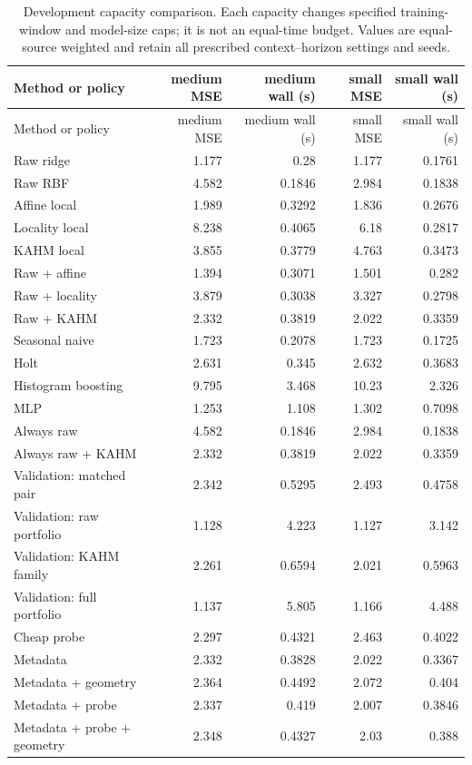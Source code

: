 {\small\setlength{\tabcolsep}{4pt}
\begin{longtable}{lrrrr}
\caption{Development capacity comparison. Each capacity changes specified training-window and model-size caps; it is not an equal-time budget. Values are equal-source weighted and retain all prescribed context--horizon settings and seeds.}\label{tab:capacity-development}\\
\toprule
Method or policy & medium MSE & medium wall (s) & small MSE & small wall (s) \\
\midrule
\endfirsthead
\toprule
Method or policy & medium MSE & medium wall (s) & small MSE & small wall (s) \\
\midrule
\endhead
Raw ridge & 1.177 & 0.28 & 1.177 & 0.1761 \\
Raw RBF & 4.582 & 0.1846 & 2.984 & 0.1838 \\
Affine local & 1.989 & 0.3292 & 1.836 & 0.2676 \\
Locality local & 8.238 & 0.4065 & 6.18 & 0.2817 \\
KAHM local & 3.855 & 0.3779 & 4.763 & 0.3473 \\
Raw + affine & 1.394 & 0.3071 & 1.501 & 0.282 \\
Raw + locality & 3.879 & 0.3038 & 3.327 & 0.2798 \\
Raw + KAHM & 2.332 & 0.3819 & 2.022 & 0.3359 \\
Seasonal naive & 1.723 & 0.2078 & 1.723 & 0.1725 \\
Holt & 2.631 & 0.345 & 2.632 & 0.3683 \\
Histogram boosting & 9.795 & 3.468 & 10.23 & 2.326 \\
MLP & 1.253 & 1.108 & 1.302 & 0.7098 \\
Always raw & 4.582 & 0.1846 & 2.984 & 0.1838 \\
Always raw + KAHM & 2.332 & 0.3819 & 2.022 & 0.3359 \\
Validation: matched pair & 2.342 & 0.5295 & 2.493 & 0.4758 \\
Validation: raw portfolio & 1.128 & 4.223 & 1.127 & 3.142 \\
Validation: KAHM family & 2.261 & 0.6594 & 2.021 & 0.5963 \\
Validation: full portfolio & 1.137 & 5.805 & 1.166 & 4.488 \\
Cheap probe & 2.297 & 0.4321 & 2.463 & 0.4022 \\
Metadata & 2.332 & 0.3828 & 2.022 & 0.3367 \\
Metadata + geometry & 2.364 & 0.4492 & 2.072 & 0.404 \\
Metadata + probe & 2.337 & 0.419 & 2.007 & 0.3846 \\
Metadata + probe + geometry & 2.348 & 0.4327 & 2.03 & 0.388 \\
\bottomrule
\end{longtable}
}

